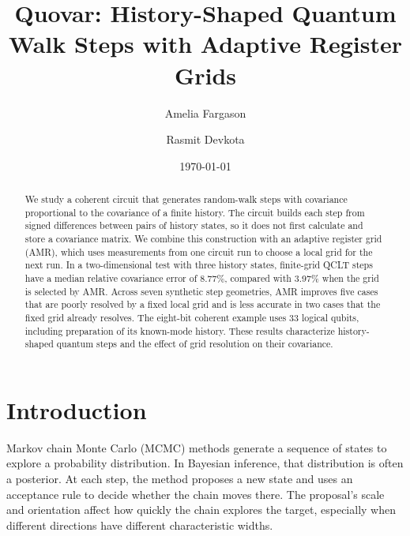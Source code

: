 \documentclass[twocolumn,reprint,aps,prd,floatfix,amsmath,amssymb]{revtex4-2}
\begin{document}
\title{Quovar: History-Shaped Quantum Walk Steps with Adaptive Register Grids}

\author{Amelia Fargason}

\author{Rasmit Devkota}

\date{\today}

\begin{abstract}
We study a coherent circuit that generates random-walk steps with covariance proportional to the covariance of a finite history. The circuit builds each step from signed differences between pairs of history states, so it does not first calculate and store a covariance matrix. We combine this construction with an adaptive register grid (AMR), which uses measurements from one circuit run to choose a local grid for the next run. In a two-dimensional test with three history states, finite-grid QCLT steps have a median relative covariance error of 8.77\%, compared with 3.97\% when the grid is selected by AMR. Across seven synthetic step geometries, AMR improves five cases that are poorly resolved by a fixed local grid and is less accurate in two cases that the fixed grid already resolves. The eight-bit coherent example uses 33 logical qubits, including preparation of its known-mode history. These results characterize history-shaped quantum steps and the effect of grid resolution on their covariance.
\end{abstract}
\maketitle

\section{Introduction}

Markov chain Monte Carlo (MCMC) methods generate a sequence of states to explore a probability distribution. In Bayesian inference, that distribution is often a posterior. At each step, the method proposes a new state and uses an acceptance rule to decide whether the chain moves there. The proposal's scale and orientation affect how quickly the chain explores the target, especially when different directions have different characteristic widths.
\end{document}
